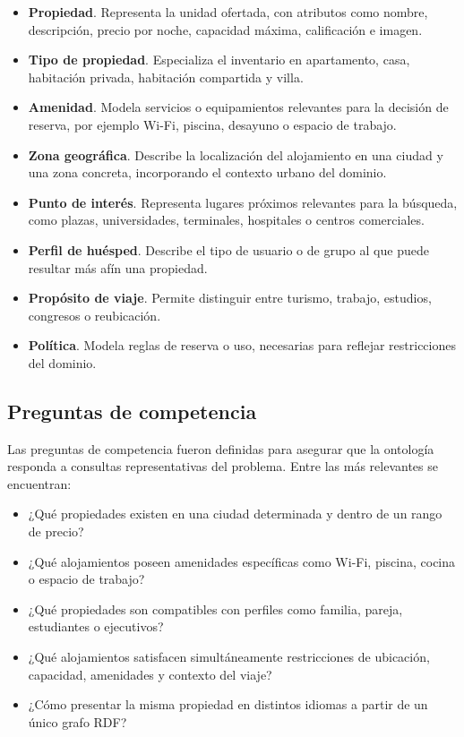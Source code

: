 \begin{itemize}
  \item \textbf{Propiedad}. Representa la unidad ofertada, con atributos como nombre,
  descripción, precio por noche, capacidad máxima, calificación e imagen.

  \item \textbf{Tipo de propiedad}. Especializa el inventario en apartamento, casa,
  habitación privada, habitación compartida y villa.

  \item \textbf{Amenidad}. Modela servicios o equipamientos relevantes para la decisión
  de reserva, por ejemplo Wi-Fi, piscina, desayuno o espacio de trabajo.

  \item \textbf{Zona geográfica}. Describe la localización del alojamiento en una ciudad
  y una zona concreta, incorporando el contexto urbano del dominio.

  \item \textbf{Punto de interés}. Representa lugares próximos relevantes para la
  búsqueda, como plazas, universidades, terminales, hospitales o centros comerciales.

  \item \textbf{Perfil de huésped}. Describe el tipo de usuario o de grupo al que puede
  resultar más afín una propiedad.

  \item \textbf{Propósito de viaje}. Permite distinguir entre turismo, trabajo,
  estudios, congresos o reubicación.

  \item \textbf{Política}. Modela reglas de reserva o uso, necesarias para reflejar
  restricciones del dominio.
\end{itemize}

\subsection{Preguntas de competencia}

Las preguntas de competencia fueron definidas para asegurar que la ontología responda a
consultas representativas del problema. Entre las más relevantes se encuentran:

\begin{itemize}
  \item ¿Qué propiedades existen en una ciudad determinada y dentro de un rango de
  precio?
  \item ¿Qué alojamientos poseen amenidades específicas como Wi-Fi, piscina, cocina o
  espacio de trabajo?
  \item ¿Qué propiedades son compatibles con perfiles como familia, pareja, estudiantes
  o ejecutivos?
  \item ¿Qué alojamientos satisfacen simultáneamente restricciones de ubicación,
  capacidad, amenidades y contexto del viaje?
  \item ¿Cómo presentar la misma propiedad en distintos idiomas a partir de un único
  grafo RDF?
\end{itemize}

